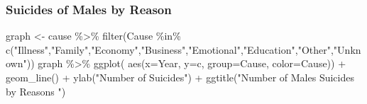 \documentclass[
  11pt,
  a4paper,
  DIV=11,
  numbers=noendperiod]{scrartcl}
\newenvironment{Shaded}{\begin{snugshade}}{\end{snugshade}}
\newcommand{\AttributeTok}[1]{\textcolor[rgb]{0.40,0.45,0.13}{#1}}
\newcommand{\DecValTok}[1]{\textcolor[rgb]{0.68,0.00,0.00}{#1}}
\newcommand{\FunctionTok}[1]{\textcolor[rgb]{0.28,0.35,0.67}{#1}}
\newcommand{\NormalTok}[1]{\textcolor[rgb]{0.00,0.23,0.31}{#1}}
\newcommand{\OtherTok}[1]{\textcolor[rgb]{0.00,0.23,0.31}{#1}}
\newcommand{\SpecialCharTok}[1]{\textcolor[rgb]{0.37,0.37,0.37}{#1}}
\newcommand{\StringTok}[1]{\textcolor[rgb]{0.13,0.47,0.30}{#1}}
\begin{document}
\begin{Shaded}
\end{Shaded}

\hypertarget{suicides-of-males-by-reason}{%
\subsubsection{\texorpdfstring{\textbf{Suicides of Males by
Reason}}{Suicides of Males by Reason}}\label{suicides-of-males-by-reason}}

\begin{Shaded}
\begin{Highlighting}[]
\NormalTok{graph }\OtherTok{\textless{}{-}}\NormalTok{ cause }\SpecialCharTok{\%\textgreater{}\%} 
    \FunctionTok{filter}\NormalTok{(Cause }\SpecialCharTok{\%in\%} \FunctionTok{c}\NormalTok{(}\StringTok{"Illness"}\NormalTok{,}\StringTok{"Family"}\NormalTok{,}\StringTok{"Economy"}\NormalTok{,}\StringTok{"Business"}\NormalTok{,}\StringTok{"Emotional"}\NormalTok{,}\StringTok{"Education"}\NormalTok{,}\StringTok{"Other"}\NormalTok{,}\StringTok{"Unknown"}\NormalTok{))}
\NormalTok{  graph }\SpecialCharTok{\%\textgreater{}\%}
    \FunctionTok{ggplot}\NormalTok{( }\FunctionTok{aes}\NormalTok{(}\AttributeTok{x=}\NormalTok{Year, }\AttributeTok{y=}\NormalTok{c, }\AttributeTok{group=}\NormalTok{Cause, }\AttributeTok{color=}\NormalTok{Cause)) }\SpecialCharTok{+}
      \FunctionTok{geom\_line}\NormalTok{() }\SpecialCharTok{+}
      \FunctionTok{ylab}\NormalTok{(}\StringTok{"Number of Suicides"}\NormalTok{) }\SpecialCharTok{+}
      \FunctionTok{ggtitle}\NormalTok{(}\StringTok{"Number of Males\textquotesingle{} Suicides by Reasons "}\NormalTok{)}
\end{Highlighting}
\end{Shaded}
\end{document}

